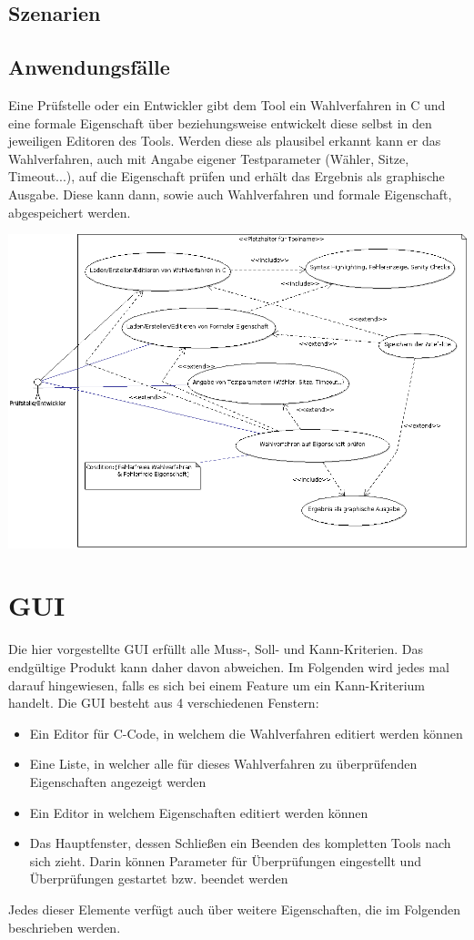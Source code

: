 \documentclass[a4paper]{scrreprt}
\begin{document}
\section{Szenarien}
\section{Anwendungsfälle}
Eine Prüfstelle oder ein Entwickler gibt dem Tool ein Wahlverfahren in C und eine formale 
Eigenschaft über beziehungsweise entwickelt diese selbst in den jeweiligen Editoren des Tools. 
Werden diese als plausibel erkannt kann er das Wahlverfahren, auch mit Angabe eigener 
Testparameter (Wähler, Sitze, Timeout...), auf die Eigenschaft prüfen und erhält das Ergebnis 
als graphische Ausgabe. 
Diese kann dann, sowie auch Wahlverfahren und formale Eigenschaft, abgespeichert werden.


{\vspace{0.5cm}\hspace*{-3cm}\includegraphics[scale=0.49]{Use-Case-Diagram}}
	


\chapter{GUI}
Die hier vorgestellte \ac{GUI} erfüllt alle Muss-, Soll- und Kann-Kriterien. Das endgültige Produkt kann daher davon abweichen. Im Folgenden wird jedes mal darauf hingewiesen, falls es sich bei einem Feature um ein Kann-Kriterium handelt.
Die \ac{GUI} besteht aus 4 verschiedenen Fenstern: 
\begin{itemize}
\item Ein Editor für C-Code, in welchem die Wahlverfahren editiert werden können
\item Eine Liste, in welcher alle für dieses Wahlverfahren zu überprüfenden Eigenschaften angezeigt werden
\item Ein Editor in welchem Eigenschaften editiert werden können
\item Das Hauptfenster, dessen Schließen ein Beenden des kompletten Tools nach sich zieht. Darin können Parameter für Überprüfungen eingestellt und Überprüfungen gestartet bzw. beendet werden
\end{itemize}
Jedes dieser Elemente verfügt auch über weitere Eigenschaften, die im Folgenden beschrieben werden.
\end{document}
